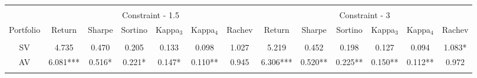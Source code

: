 \begin{tabular}{@{\extracolsep{5pt}} ccccccccccccc} 
\hline \\[-1.8ex] 
& \multicolumn{6}{c}{Constraint - 1.5} &\multicolumn{6}{c}{Constraint - 3}\\
\cline{2-7} \cline{8-13}
Portfolio & Return & Sharpe & Sortino & Kappa$_{3}$ & Kappa$_{4}$ & Rachev & Return & Sharpe & Sortino & Kappa$_{3}$ & Kappa$_{4}$ & Rachev \\ 
\hline \\[-1.8ex] 
SV & 4.735 & 0.470 & 0.205 & 0.133 & 0.098 & 1.027 & 5.219 & 0.452 & 0.198 & 0.127 & 0.094 & 1.083* \\ 
AV & 6.081*** & 0.516* & 0.221* & 0.147* & 0.110** & 0.945 & 6.306*** & 0.520** & 0.225** & 0.150** & 0.112** & 0.972 \\ 
\hline\\
\end{tabular}